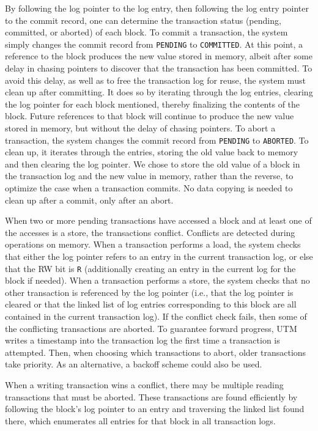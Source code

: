 By following the log pointer to the log entry, then following the log
entry pointer to the commit record, one can determine the transaction
status (pending, committed, or aborted) of each block.  To commit a
transaction, the system simply changes the commit record from
\texttt{PENDING} to \texttt{COMMITTED}.  At this point, a reference to
the block produces the new value stored in memory, albeit after some
delay in chasing pointers to discover that the transaction has been
committed.  To avoid this delay, as well as to free the transaction
log for reuse, the system must clean up after committing.  It does so
by iterating through the log entries, clearing the log pointer for
each block mentioned, thereby finalizing the contents of the block.
Future references to that block will continue to produce the new value
stored in memory, but without the delay of chasing pointers.  To abort
a transaction, the system changes the commit record from
\texttt{PENDING} to \texttt{ABORTED}.  To clean up, it iterates
through the entries, storing the old value back to memory and then
clearing the log pointer.  We chose to store the old value of a block
in the transaction log and the new value in memory, rather than the
reverse, to optimize the case when a transaction commits.  No data
copying is needed to clean up after a commit, only after an abort.

When two or more pending transactions have accessed a block and at
least one of the accesses is a store, the transactions conflict.
Conflicts are detected during operations on memory.  When a
transaction performs a load, the system checks that either the log
pointer refers to an entry in the current transaction log, or else
that the RW bit is \texttt{R} (additionally creating an entry in the
current log for the block if needed).  When a transaction performs a
store, the system checks that no other transaction is referenced by
the log pointer (i.e., that the log pointer is cleared or that the
linked list of log entries corresponding to this block are all
contained in the current transaction log).  If the conflict check
fails, then some of the conflicting transactions are aborted.  To
guarantee forward progress, UTM writes a timestamp into the
transaction log the first time a transaction is attempted.  Then, when
choosing which transactions to abort, older transactions take
priority.  As an alternative, a backoff scheme \cite{MetcalfeBo76}
could also be used.

When a writing transaction wins a conflict, there may be multiple
reading transactions that must be aborted.  These transactions are
found efficiently by following the block's log pointer to an entry and
traversing the linked list found there, which enumerates all entries
for that block in all transaction logs.

